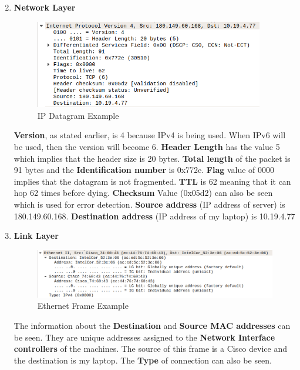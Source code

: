 \documentclass[a4paper,10pt]{article}
\newlength{\strutheight}
\begin{document}
\begin{enumerate}
\begin{adjustbox}{valign=T,raise=\strutheight,minipage={\linewidth}}
	\end{adjustbox} 
	\pagebreak
	\item \textbf{\color{Magenta} \large Network Layer }\\
	\begin{adjustbox}{valign=T,raise=\strutheight,minipage={\linewidth}}
		\begin{figure}
			\includegraphics[width=10cm]{Images/IpEx}
			\caption{IP Datagram Example}
		\end{figure}
		\strut{}
		\textbf{Version}, as stated earlier, is 4 because IPv4 is being used. When IPv6 will be used, then the version will become 6. \textbf{Header Length} has the value 5 which implies that the header size is 20 bytes. \textbf{Total length} of the packet is 91 bytes and the \textbf{Identification number} is 0x772e. \textbf{Flag} value of 0000 implies that the datagram is not fragmented. \textbf{TTL} is 62 meaning that it can hop 62 times before dying. \textbf{Checksum} Value (0x05d2) can also be seen which is used for error detection. \textbf{Source address} (IP address of server) is 180.149.60.168. \textbf{Destination address} (IP address of my laptop) is 10.19.4.77
	\end{adjustbox} 
	\item \textbf{\color{Magenta} \large Link Layer }\\
	\begin{adjustbox}{valign=T,raise=\strutheight,minipage={\linewidth}}
		\begin{figure}
			\includegraphics[width=12cm]{Images/linkEx}
			\caption{Ethernet Frame Example}
		\end{figure}
		\strut{}
		The information about the \textbf{Destination} and \textbf{Source MAC addresses} can be seen. They are unique addresses assigned to the \textbf{Network Interface controllers} of the machines. The source of this frame is a Cisco device and the destination is my laptop. The \textbf{Type} of connection can also be seen.
	\end{adjustbox} 
\end{enumerate}
\end{document}
